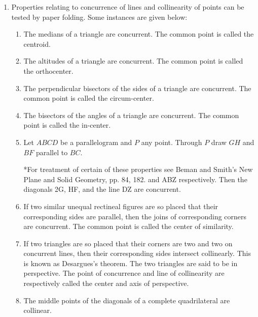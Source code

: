 \begin{enumerate}
\item Properties relating to concurrence of lines and collinearity of points can
    be tested by paper folding.  Some instances are given below:

    \begin{enumerate}[(1)]

        \item The medians of a triangle are concurrent.  The common point is
            called the centroid.

        \item The altitudes of a triangle are concurrent.  The common point is
            called the orthocenter.

        \item The perpendicular bisectors of the sides of a triangle are
            concurrent.  The common point is called the circum-center.

        \item The bisectors of the angles of a triangle are concurrent.  The
            common point is called the in-center.

        \item Let $ABCD$ be a parallelogram and $P$ any point. Through $P$ draw
            $GH$ and $BF$ parallel to $BC$.


            *For treatment of certain of these properties see Beman and Smith's
            New Plane and Solid Geometry, pp. 84, 182.  and ABZ respectively.
            Then the diagonals 2G, HF, and the line DZ are concurrent.

        \item If two similar unequal rectineal figures are so placed that their
            corresponding sides are parallel, then the joins of corresponding
            corners are concurrent.  The common point is called the center of
            similarity.

        \item If two triangles are so placed that their corners are two and two
            on concurrent lines, then their corresponding sides intersect
            collinearly.  This is known as Desargues's theorem. The two
            triangles are said to be in perspective. The point of concurrence
            and line of collinearity are respectively called the center and axis
            of perspective.

        \item The middle points of the diagonals of a complete quadrilateral are
            collinear.


\end{enumerate}
\end{enumerate}
